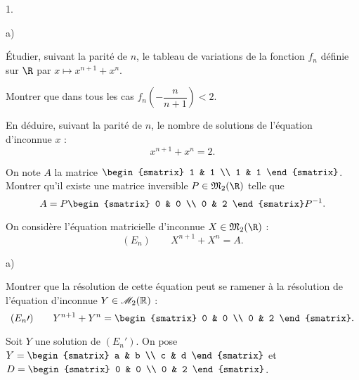 \documentclass[11pt]{article}%
\begin{document}
\begin{noliste}{1.}
 \setlength{\itemsep}{4mm}
\item 

\begin{noliste}{a)}
 \setlength{\itemsep}{2mm}
\item Étudier, suivant la parité de $n$, le tableau de variations de la
fonction $f_{n}$ définie sur $\R$ par $x\mapsto x^{n + 1} + x^{n}$.

\item Montrer que dans tous les cas $f_{n}\left( -\dfrac{n}{n +
1}\right) <2$.

\item En déduire, suivant la parité de $n$, le nombre de solutions de
l'équation d'inconnue $x$ : 
\[
x^{n + 1} + x^{n} = 2.
\]
\end{noliste}

\item On note $A$ la matrice $\begin{smatrix}
1 & 1 \\
1 & 1
\end{smatrix}
$. Montrer qu'il existe une matrice inversible $P\in
\mathfrak{M}_{2}(\R)$ telle que 
\[
A = P
\begin{smatrix}
0 & 0 \\
0 & 2
\end{smatrix}
P^{-1}.
\]

\item On considère l'équation matricielle d'inconnue $X\in
\mathfrak{M}_{2}(\R)$ : 
\[
(E_{n})\qquad X^{n + 1} + X^{n} = A.
\]

\begin{noliste}{a)}
 \setlength{\itemsep}{2mm}
\item Montrer que la résolution de cette équation peut se ramener à la
résolution de l'équation d'inconnue $Y\in \mathscr{M}_{2}(\mathbb{R})$ : 
\[
(E_{n}{\prime })\qquad Y^{n + 1} + Y^{n} = 
\begin{smatrix}
0 & 0 \\
0 & 2
\end{smatrix}.
\]

\item Soit $Y$ une solution de $(E_{n}{\prime })$. On pose $Y = 
\begin{smatrix}
a & b \\
c & d
\end{smatrix}
$ et $D = 
\begin{smatrix}
0 & 0 \\
0 & 2
\end{smatrix}
$.


\end{noliste}
\end{noliste}
\end{document}
